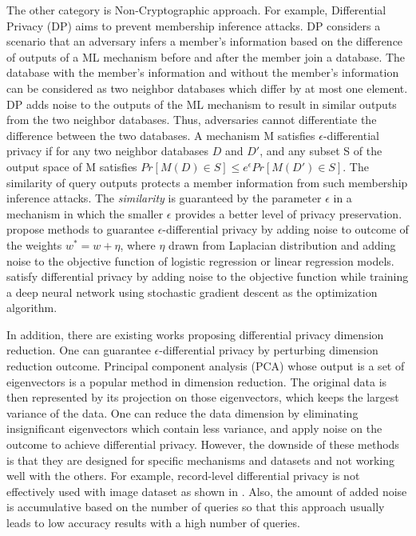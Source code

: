 The other category is Non-Cryptographic approach. For example, Differential Privacy (DP) \cite{Dwork2006} aims to prevent membership inference attacks. DP considers a scenario that an adversary infers a member's information based on the difference of outputs of a ML mechanism before and after the member join a database. The database with the member's information and without the member's information can be considered as two neighbor databases which differ by at most one element. DP adds noise to the outputs of the ML mechanism to result in similar outputs from the two neighbor databases. Thus, adversaries cannot differentiate the difference between the two databases. A mechanism M satisfies $\epsilon$-differential privacy if for any two neighbor databases $D$ and $D'$, and any subset S of the output space of M satisfies 
$ Pr[M(D) \in S] \leq e^{\epsilon}  Pr[M(D') \in S]  $. 
The similarity of query outputs protects a member information from such membership inference attacks. The \textit{similarity} is guaranteed by the parameter $\epsilon$ in a mechanism in which the smaller $\epsilon$ provides a better level of privacy preservation. \cite{Chaudhuri, Zhang2012,NIPS2008, Wu, MYang} propose methods to guarantee $\epsilon$-differential privacy by adding noise to outcome of the weights $w^*= w + \eta$, where $\eta$ drawn from Laplacian distribution and adding noise to the objective function of logistic regression or linear regression models. \cite{Phan2016,Abadi2016} satisfy differential privacy by adding noise to the objective function while training a deep neural network using stochastic gradient descent as the optimization algorithm. 

In addition, there are existing works proposing differential privacy dimension reduction. One can guarantee $\epsilon$-differential privacy by perturbing dimension reduction outcome. Principal component analysis (PCA) whose output is a set of eigenvectors is a popular method in dimension reduction. The original data is then represented by its projection on those eigenvectors, which keeps the largest variance of the data. One can reduce the data dimension by eliminating insignificant eigenvectors which contain less variance, and apply noise on the outcome to achieve differential privacy\cite{XiaoqianJiangZhanglongJiShuangWangNomanMohammedSamuelCheng2013}. However, the downside of these methods is that they are designed for specific mechanisms and datasets and not working well with the others. For example, record-level differential privacy is not effectively used with image dataset as shown in \cite{Hitaj2017}. Also, the amount of added noise is accumulative based on the number of queries so that this approach usually leads to low accuracy results with a high number of queries. 

